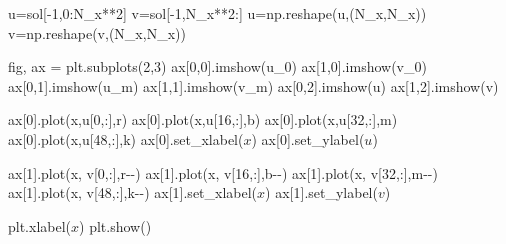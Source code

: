 \documentclass[
  letterpaper,
  DIV=11,
  numbers=noendperiod]{scrreprt}
\newenvironment{Shaded}{\begin{snugshade}}{\end{snugshade}}
\newcommand{\CommentTok}[1]{\textcolor[rgb]{0.37,0.37,0.37}{#1}}
\newcommand{\DecValTok}[1]{\textcolor[rgb]{0.68,0.00,0.00}{#1}}
\newcommand{\NormalTok}[1]{\textcolor[rgb]{0.00,0.23,0.31}{#1}}
\newcommand{\OperatorTok}[1]{\textcolor[rgb]{0.37,0.37,0.37}{#1}}
\newcommand{\StringTok}[1]{\textcolor[rgb]{0.13,0.47,0.30}{#1}}
\theoremstyle{plain}
\theoremstyle{definition}
\theoremstyle{plain}
\theoremstyle{remark}
\begin{document}
\begin{Shaded}
\begin{Highlighting}[]
\NormalTok{u}\OperatorTok{=}\NormalTok{sol[}\OperatorTok{{-}}\DecValTok{1}\NormalTok{,}\DecValTok{0}\NormalTok{:N\_x}\OperatorTok{**}\DecValTok{2}\NormalTok{]}
\NormalTok{v}\OperatorTok{=}\NormalTok{sol[}\OperatorTok{{-}}\DecValTok{1}\NormalTok{,N\_x}\OperatorTok{**}\DecValTok{2}\NormalTok{:]}
\NormalTok{u}\OperatorTok{=}\NormalTok{np.reshape(u,(N\_x,N\_x))}
\NormalTok{v}\OperatorTok{=}\NormalTok{np.reshape(v,(N\_x,N\_x))}

\NormalTok{fig, ax }\OperatorTok{=}\NormalTok{ plt.subplots(}\DecValTok{2}\NormalTok{,}\DecValTok{3}\NormalTok{)}
\NormalTok{ax[}\DecValTok{0}\NormalTok{,}\DecValTok{0}\NormalTok{].imshow(u\_0)}
\NormalTok{ax[}\DecValTok{1}\NormalTok{,}\DecValTok{0}\NormalTok{].imshow(v\_0)}
\NormalTok{ax[}\DecValTok{0}\NormalTok{,}\DecValTok{1}\NormalTok{].imshow(u\_m)}
\NormalTok{ax[}\DecValTok{1}\NormalTok{,}\DecValTok{1}\NormalTok{].imshow(v\_m)}
\NormalTok{ax[}\DecValTok{0}\NormalTok{,}\DecValTok{2}\NormalTok{].imshow(u)}
\NormalTok{ax[}\DecValTok{1}\NormalTok{,}\DecValTok{2}\NormalTok{].imshow(v)}

\CommentTok{\textquotesingle{}\textquotesingle{}\textquotesingle{}}
\CommentTok{ax[0].plot(x,u[0,:],\textquotesingle{}r\textquotesingle{})}
\CommentTok{ax[0].plot(x,u[16,:],\textquotesingle{}b\textquotesingle{})}
\CommentTok{ax[0].plot(x,u[32,:],\textquotesingle{}m\textquotesingle{})}
\CommentTok{ax[0].plot(x,u[48,:],\textquotesingle{}k\textquotesingle{})}
\CommentTok{ax[0].set\_xlabel(\textquotesingle{}$x$\textquotesingle{})}
\CommentTok{ax[0].set\_ylabel(\textquotesingle{}$u$\textquotesingle{})}

\CommentTok{ax[1].plot(x, v[0,:],\textquotesingle{}r{-}{-}\textquotesingle{})}
\CommentTok{ax[1].plot(x, v[16,:],\textquotesingle{}b{-}{-}\textquotesingle{})}
\CommentTok{ax[1].plot(x, v[32,:],\textquotesingle{}m{-}{-}\textquotesingle{})}
\CommentTok{ax[1].plot(x, v[48,:],\textquotesingle{}k{-}{-}\textquotesingle{})}
\CommentTok{ax[1].set\_xlabel(\textquotesingle{}$x$\textquotesingle{})}
\CommentTok{ax[1].set\_ylabel(\textquotesingle{}$v$\textquotesingle{})}
\CommentTok{\textquotesingle{}\textquotesingle{}\textquotesingle{}}

\NormalTok{plt.xlabel(}\StringTok{\textquotesingle{}$x$\textquotesingle{}}\NormalTok{)}
\NormalTok{plt.show()}
\end{Highlighting}
\end{Shaded}
\end{document}
